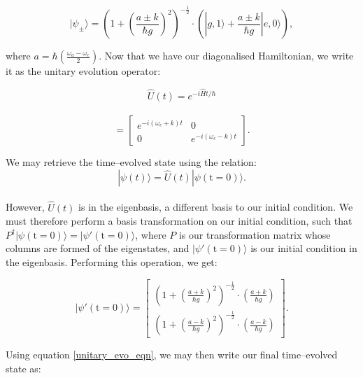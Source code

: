 \documentclass[12pt]{article}
\begin{document}
\begin{equation*}
    |\psi_\pm\rangle = \left(1 + \left(\frac{a\pm k}{\hbar g}\right)^2\right)^{-\frac{1}{2}} \cdot\left(|g,1\rangle + \frac{a\pm k}{\hbar g}|e,0\rangle\right),
\end{equation*}

where $a = \hbar\left(\frac{\omega_a - \omega_c}{2}\right)$. Now that we have our diagonalised Hamiltonian, we write it as the unitary evolution operator:

\begin{equation*}
    \hat{U}(t) = e^{-i\hat{H}t/\hbar}
\end{equation*}
\\ 
\begin{equation*}
    = 
    \begin{bmatrix}
        e^{-i(\omega_c + k)t} & 0 \\
        0 & e^{-i(\omega_c - k)t}
    \end{bmatrix}.
\end{equation*}

We may retrieve the time--evolved state using the relation:
\begin{equation} \label{unitary_evo_eqn}
    |\psi(t)\rangle = \hat{U}(t)|\psi(\text{t}=0)\rangle.
\end{equation}
\\
However, $\hat{U}(t)$ is in the eigenbasis, a different basis to our initial condition. We must therefore perform a basis transformation on our initial condition, such that $P^\dagger|\psi(\text{t} = 0)\rangle = |\psi'(\text{t} = 0)\rangle$, where $P$ is our transformation matrix whose columns are formed of the eigenstates, and $|\psi'(\text{t} = 0)\rangle$ is our initial condition in the eigenbasis. Performing this operation, we get:

\begin{equation*}
    |\psi'(\text{t} = 0)\rangle = 
    \begin{bmatrix}
        \left(1 + \left(\frac{a + k}{\hbar g}\right)^2\right)^{-\frac{1}{2}}\cdot\left(\frac{a + k}{\hbar g}\right) \\
        \left(1 + \left(\frac{a - k}{\hbar g}\right)^2\right)^{-\frac{1}{2}}\cdot\left(\frac{a - k}{\hbar g}\right)
    \end{bmatrix}.
\end{equation*}

Using equation \eqref{unitary_evo_eqn}, we may then write our final time--evolved state as:
\end{document}
